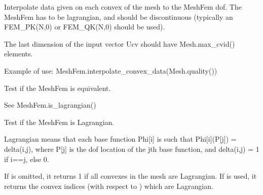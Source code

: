 \documentclass[a4paper,11pt,english]{sphinxmanual}
\begin{document}
\begin{fulllineitems}

\begin{fulllineitems}
\label{\detokenize{python/cmdref_MeshFem:getfem.MeshFem.interpolate_convex_data}}
Interpolate data given on each convex of the mesh to the MeshFem dof.
The MeshFem has to be lagrangian, and should be discontinuous (typically
an FEM\_PK(N,0) or FEM\_QK(N,0) should be used).

The last dimension of the input vector Ucv should have
Mesh.max\_cvid() elements.

Example of use: MeshFem.interpolate\_convex\_data(Mesh.quality())

\end{fulllineitems}


\begin{fulllineitems}
\label{\detokenize{python/cmdref_MeshFem:getfem.MeshFem.is_equivalent}}
Test if the MeshFem is equivalent.

See MeshFem.is\_lagrangian()

\end{fulllineitems}


\begin{fulllineitems}
\label{\detokenize{python/cmdref_MeshFem:getfem.MeshFem.is_lagrangian}}
Test if the MeshFem is Lagrangian.

Lagrangian means that each base function Phi{[}i{]} is such that
Phi{[}i{]}(P{[}j{]}) = delta(i,j), where P{[}j{]} is the dof location of
the jth base function, and delta(i,j) = 1 if i==j, else 0.

If  is omitted, it returns 1 if all convexes in the mesh
are Lagrangian. If  is used, it returns the convex indices
(with respect to ) which are Lagrangian.


\end{fulllineitems}
\end{fulllineitems}
\end{document}
